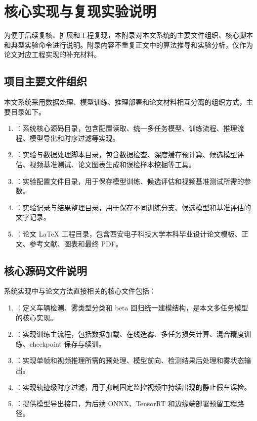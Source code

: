 \chapter{核心实现与复现实验说明}

为便于后续复核、扩展和工程复现，本附录对本文系统的主要文件组织、核心脚本和典型实验命令进行说明。附录内容不重复正文中的算法推导和实验分析，仅作为论文对应工程实现的补充材料。

\section{项目主要文件组织}

本文系统采用数据处理、模型训练、推理部署和论文材料相互分离的组织方式，主要目录如下。

\begin{enumerate}[leftmargin=2.5em]
\item {}：系统核心源码目录，包含配置读取、统一多任务模型、训练流程、推理流程、模型导出和时序过滤等实现。
\item {}：实验与数据处理脚本目录，包含数据检查、深度缓存预计算、候选模型评估、视频基准测试、论文图表生成和误检样本挖掘等工具。
\item {}：实验配置文件目录，用于保存模型训练、候选评估和视频基准测试所需的参数。
\item {}：实验记录与结果整理目录，用于保存不同训练分支、候选模型和基准评估的文字记录。
\item {}：论文 LaTeX 工程目录，包含西安电子科技大学本科毕业设计论文模板、正文、参考文献、图表和最终 PDF。
\end{enumerate}

\section{核心源码文件说明}

系统实现中与论文方法直接相关的核心文件包括：

\begin{enumerate}[leftmargin=2.5em]
\item {}：定义车辆检测、雾类型分类和 beta 回归统一建模结构，是本文多任务模型的核心实现。
\item {}：实现训练主流程，包括数据加载、在线造雾、多任务损失计算、混合精度训练、checkpoint 保存与续训。
\item {}：实现单帧和视频推理所需的预处理、模型前向、检测结果后处理和雾状态输出。
\item {}：实现轨迹级时序过滤，用于抑制固定监控视频中持续出现的静止假车误检。
\item {}：提供模型导出接口，为后续 ONNX、TensorRT 和边缘端部署预留工程路径。
\end{enumerate}

